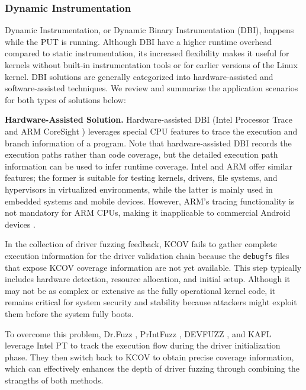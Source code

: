 
\subsubsection{Dynamic Instrumentation}
Dynamic Instrumentation, or Dynamic Binary Instrumentation (DBI), happens while the PUT is running. Although DBI have a higher runtime overhead compared to static instrumentation, its increased flexibility makes it useful for kernels without built-in instrumentation tools or for earlier versions of the Linux kernel. DBI solutions are generally categorized into hardware-assisted and software-assisted techniques. We review and summarize the application scenarios for both types of solutions below:

\textbf{Hardware-Assisted Solution.}
Hardware-assisted DBI (\eg Intel Processor Trace \cite{kleen2015,simplept} and ARM CoreSight \cite{coresight2017}) leverages special CPU features to trace the execution and branch information of a program. Note that hardware-assisted DBI records the execution paths rather than code coverage, but the detailed execution path information can be used to infer runtime coverage. Intel and ARM offer similar features; the former is suitable for testing kernels, drivers, file systems, and hypervisors in virtualized environments, while the latter is mainly used in embedded systems and mobile devices. However, ARM's tracing functionality is not mandatory for ARM CPUs, making it inapplicable to commercial Android devices \cite{Chizpurfle2019}.

In the collection of driver fuzzing feedback, KCOV fails to gather complete execution information for the driver validation chain because the \texttt{debugfs} files that expose KCOV coverage information are not yet available. This step typically includes hardware detection, resource allocation, and initial setup. Although it may not be as complex or extensive as the fully operational kernel code, it remains critical for system security and stability because attackers might exploit them before the system fully boots.

To overcome this problem, Dr.Fuzz \cite{zhao2022semantic}, PrIntFuzz \cite{ma2022printfuzz}, DEVFUZZ \cite{wu2023devfuzz}, and KAFL \cite{schumilo2017kafl} leverage Intel PT to track the execution flow during the driver initialization phase. They then switch back to KCOV to obtain precise coverage information, which can effectively enhances the depth of driver fuzzing through combining the strangths of both methods.


